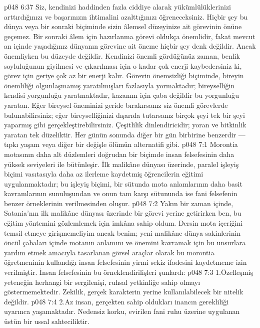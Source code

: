 \vs p048 6:37 Siz, kendinizi haddinden fazla ciddiye alarak yükümlülüklerinizi arttırdığınızı ve başarınızın ihtimalini azalttığınızı öğreneceksiniz. Hiçbir şey bu dünya veya bir sonraki biçiminde sizin âlemsel düzeyinize ait görevinin önüne geçemez. Bir sonraki âlem için hazırlanma görevi oldukça önemlidir, fakat mevcut an içinde yaşadığınız dünyanın görevine ait öneme hiçbir şey denk değildir. Ancak  önemliyken  bu düzeyde değildir. Kendinizi önemli gördüğünüz zaman, benlik soyluluğunun giyilmesi ve çıkarılması için o kadar çok enerji kaybedersiniz ki, görev için geriye çok az bir enerji kalır. Görevin önemsizliği biçiminde, bireyin önemliliği olgunlaşmamış yaratılmışları fazlasıyla yormaktadır; bireyselliğin kendisi yorgunluğu yaratmaktadır, kazanım için çaba değildir bu yorgunluğu yaratan. Eğer bireysel öneminizi geride bırakırsanız siz önemli görevlerde bulunabilirsiniz; eğer bireyselliğinizi dışarıda tutarsanız birçok şeyi tek bir şeyi yaparmış gibi gerçekleştirebilirsiniz. Çeşitlilik dinlendiricidir; yoran ve bitkinlik yaratan tek düzeliktir. Her günün sonunda diğer bir gün birbirine benzerdir --- tıpkı yaşam veya diğer bir değişle ölümün alternatifi gibi.
\vs p048 7:1 Morontia motasının daha alt düzlemleri doğrudan bir biçimde insan felsefesinin daha yüksek seviyeleri ile bütünleşir. İlk malikâne dünyası üzerinde, paralel işleyiş biçimi vasıtasıyla daha az ilerleme kaydetmiş öğrencilerin eğitimi uygulanmaktadır; bu işleyiş biçimi, bir sütunda mota anlamlarının daha basit kavramlarının sunuluşundan ve onun tam karşı sütununda ise fani felsefenin benzer örneklerinin verilmesinden oluşur.
\vs p048 7:2 Yakın bir zaman içinde, Satania’nın ilk malikâne dünyası üzerinde bir görevi yerine getirirken ben, bu eğitim yöntemini gözlemlemek için imkâna sahip oldum. Dersin mota içeriğini temsil etmeye girişmemeliyim ancak benim; yeni malikâne dünya sakinlerinin öncül çabaları içinde motanın anlamını ve önemini kavramak için bu unsurlara yardım etmek amacıyla tasarlanan görsel araçlar olarak bu morontia öğretmeninin kullandığı insan felsefesinin yirmi sekiz ifadesini kaydetmeme izin verilmiştir. İnsan felsefesinin bu örneklendirilişleri şunlardı:
\vs p048 7:3 1.\bibnobreakspace Özelleşmiş yeteneğin herhangi bir sergilenişi, ruhsal yetkinliğe sahip olmayı göstermemektedir. Zekilik, gerçek karakterin yerine kullanılabilecek bir nitelik değildir.
\vs p048 7:4 2.\bibnobreakspace Az insan, gerçekten sahip oldukları inancın gerekliliği uyarınca yaşamaktadır. Nedensiz korku, evirilen fani ruhu üzerine uygulanan üstün bir ussal sahteciliktir.
